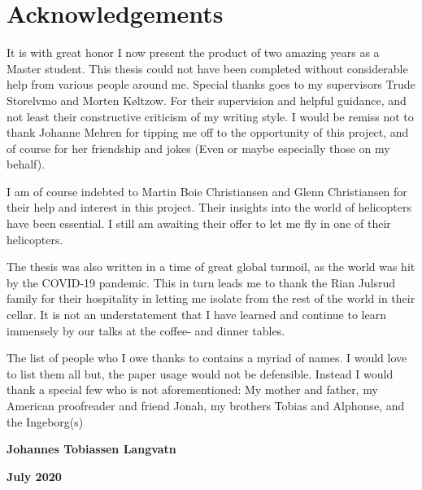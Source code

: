 \chapter*{Acknowledgements}
It is with great honor I now present the product of two amazing years as a Master student. This thesis could not have been completed without considerable help from various people around me. Special thanks goes to my supervisors Trude Storelvmo and Morten Køltzow. For their supervision and helpful guidance, and not least their constructive criticism of my writing style. I would be remiss not to thank Johanne Mehren for tipping me off to the opportunity of this project, and of course for her friendship and jokes (Even or maybe especially those on my behalf).

I am of course indebted to Martin Boie Christiansen and Glenn Christiansen for their help and interest in this project. Their insights into the world of helicopters have been essential. I still am awaiting their offer to let me fly in one of their helicopters. 

The thesis was also written in a time of great global turmoil, as the world was hit by the COVID-19 pandemic. This in turn leads me to thank the Rian Julsrud family for their hospitality in letting me isolate from the rest of the world in their cellar. It is not an understatement that I have learned and continue to learn immensely by our talks at the coffee- and dinner tables.

The list of people who I owe thanks to contains a myriad of names. I would love to list them all but, the paper usage would not be defensible. Instead I would thank a special few who is not aforementioned: My mother and father, my American proofreader and friend Jonah, my brothers Tobias and Alphonse, and the Ingeborg(s) \\

\begin{center}
\textbf{Johannes Tobiassen Langvatn}
\end{center}
\begin{center}
\textbf{July 2020}
\end{center}

